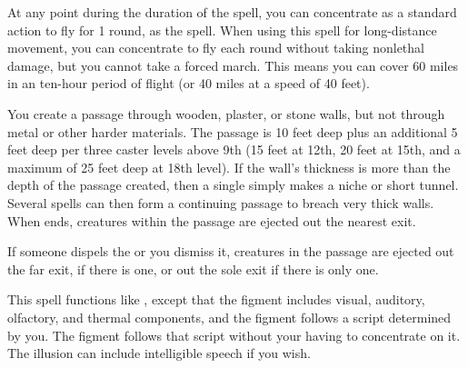 \spelldur{\durext}
\begin{spelleffect}
  At any point during the duration of the spell, you can concentrate as a standard action to fly for 1 round, as the  spell. When using this spell for long-distance movement, you can concentrate to fly each round without taking nonlethal damage, but you cannot take a forced march. This means you can cover 60 miles in an ten-hour period of flight (or 40 miles at a speed of 40 feet).
\end{spelleffect}

\begin{spelleffect}
  You create a passage through wooden, plaster, or stone walls, but not through metal or other harder materials. The passage is 10 feet deep plus an additional 5 feet deep per three caster levels above 9th (15 feet at 12th, 20 feet at 15th, and a maximum of 25 feet deep at 18th level). If the wall's thickness is more than the depth of the passage created, then a single  simply makes a niche or short tunnel. Several  spells can then form a continuing passage to breach very thick walls. When  ends, creatures within the passage are ejected out the nearest exit.
\end{spelleffect}
\begin{spellnotes}
  If someone dispels the  or you dismiss it, creatures in the passage are ejected out the far exit, if there is one, or out the sole exit if there is only one.
\end{spellnotes}

\spellrng{\rngfar}
\begin{spelleffect}
  This spell functions like , except that the figment includes visual, auditory, olfactory, and thermal components, and the figment follows a script determined by you. The figment follows that script without your having to concentrate on it. The illusion can include intelligible speech if you wish.
\end{spelleffect}


